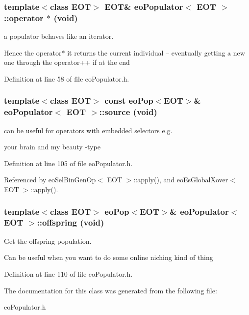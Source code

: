 \subsubsection{\setlength{\rightskip}{0pt plus 5cm}template$<$class EOT$>$ {\bf EOT}\& {\bf eo\-Populator}$<$ {\bf EOT} $>$::operator $\ast$ (void)\hspace{0.3cm}{\tt  [inline]}}\label{classeo_populator_a2}


a populator behaves like an iterator. 

Hence the operator$\ast$ it returns the current individual -- eventually getting a new one through the operator++ if at the end 

Definition at line 58 of file eo\-Populator.h.
\subsubsection{\setlength{\rightskip}{0pt plus 5cm}template$<$class EOT$>$ const {\bf eo\-Pop}$<${\bf EOT}$>$\& {\bf eo\-Populator}$<$ {\bf EOT} $>$::source (void)\hspace{0.3cm}{\tt  [inline]}}\label{classeo_populator_a6}


can be useful for operators with embedded selectors e.g. 

your brain and my beauty -type 

Definition at line 105 of file eo\-Populator.h.

Referenced by eo\-Sel\-Bin\-Gen\-Op$<$ EOT $>$::apply(), and eo\-Es\-Global\-Xover$<$ EOT $>$::apply().
\subsubsection{\setlength{\rightskip}{0pt plus 5cm}template$<$class EOT$>$ {\bf eo\-Pop}$<${\bf EOT}$>$\& {\bf eo\-Populator}$<$ {\bf EOT} $>$::offspring (void)\hspace{0.3cm}{\tt  [inline]}}\label{classeo_populator_a7}


Get the offspring population. 

Can be useful when you want to do some online niching kind of thing 

Definition at line 110 of file eo\-Populator.h.

The documentation for this class was generated from the following file:\begin{CompactItemize}
\item 
eo\-Populator.h\end{CompactItemize}
